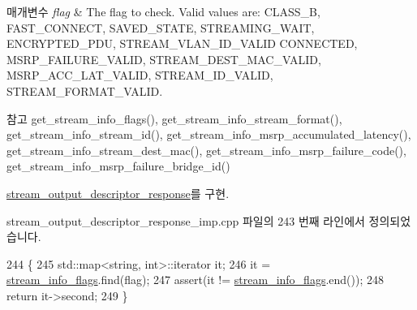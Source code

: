 \begin{DoxyParams}{매개변수}
{\em flag} & The flag to check. Valid values are\+: C\+L\+A\+S\+S\+\_\+B, F\+A\+S\+T\+\_\+\+C\+O\+N\+N\+E\+CT, S\+A\+V\+E\+D\+\_\+\+S\+T\+A\+TE, S\+T\+R\+E\+A\+M\+I\+N\+G\+\_\+\+W\+A\+IT, E\+N\+C\+R\+Y\+P\+T\+E\+D\+\_\+\+P\+DU, S\+T\+R\+E\+A\+M\+\_\+\+V\+L\+A\+N\+\_\+\+I\+D\+\_\+\+V\+A\+L\+ID C\+O\+N\+N\+E\+C\+T\+ED, M\+S\+R\+P\+\_\+\+F\+A\+I\+L\+U\+R\+E\+\_\+\+V\+A\+L\+ID, S\+T\+R\+E\+A\+M\+\_\+\+D\+E\+S\+T\+\_\+\+M\+A\+C\+\_\+\+V\+A\+L\+ID, M\+S\+R\+P\+\_\+\+A\+C\+C\+\_\+\+L\+A\+T\+\_\+\+V\+A\+L\+ID, S\+T\+R\+E\+A\+M\+\_\+\+I\+D\+\_\+\+V\+A\+L\+ID, S\+T\+R\+E\+A\+M\+\_\+\+F\+O\+R\+M\+A\+T\+\_\+\+V\+A\+L\+ID.\\
\hline
\end{DoxyParams}
\begin{DoxySeeAlso}{참고}
get\+\_\+stream\+\_\+info\+\_\+flags(), get\+\_\+stream\+\_\+info\+\_\+stream\+\_\+format(), get\+\_\+stream\+\_\+info\+\_\+stream\+\_\+id(), get\+\_\+stream\+\_\+info\+\_\+msrp\+\_\+accumulated\+\_\+latency(), get\+\_\+stream\+\_\+info\+\_\+stream\+\_\+dest\+\_\+mac(), get\+\_\+stream\+\_\+info\+\_\+msrp\+\_\+failure\+\_\+code(), get\+\_\+stream\+\_\+info\+\_\+msrp\+\_\+failure\+\_\+bridge\+\_\+id() 
\end{DoxySeeAlso}


\hyperlink{classavdecc__lib_1_1stream__output__descriptor__response_a80ed33723f4afa61e026c32661f731de}{stream\+\_\+output\+\_\+descriptor\+\_\+response}를 구현.



stream\+\_\+output\+\_\+descriptor\+\_\+response\+\_\+imp.\+cpp 파일의 243 번째 라인에서 정의되었습니다.


\begin{DoxyCode}
244 \{
245     std::map<string, int>::iterator it;
246     it = \hyperlink{classavdecc__lib_1_1stream__output__descriptor__response__imp_a7a5f929ce40eaf804944218314bff706}{stream\_info\_flags}.find(flag);
247     assert(it != \hyperlink{classavdecc__lib_1_1stream__output__descriptor__response__imp_a7a5f929ce40eaf804944218314bff706}{stream\_info\_flags}.end());
248     \textcolor{keywordflow}{return} it->second;
249 \}
\end{DoxyCode}

